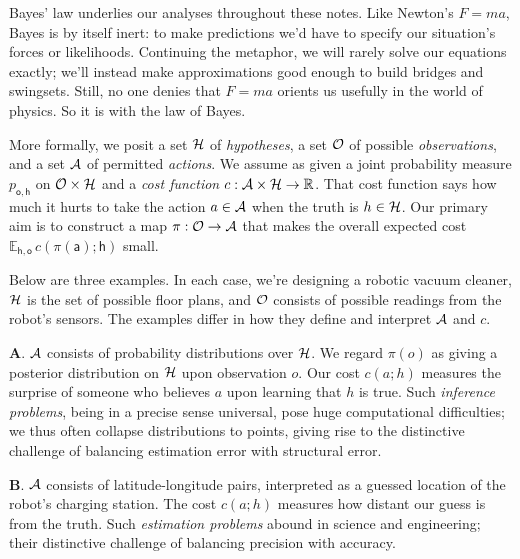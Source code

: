 \documentclass[11pt]{article}
\newcommand{\gre}{\color{mgre}}
\newcommand{\samsubsubsection}[1]{
   \vspace{0.1cm}
   \par\noindent{\hspace{-2cm}\normalsize \sc \gre #1} ---
}
\newcommand{\Ee}{\mathbb{E}}\newcommand{\eE}{\mathcal{E}}
\newcommand{\Rr}{\mathbb{R}}\newcommand{\rR}{\mathcal{R}}
\newcommand{\sfa}{\mathsf{a}}\newcommand{\fra}{\mathcal{a}}
\newcommand{\sfh}{\mathsf{h}}\newcommand{\frh}{\mathcal{h}}
\newcommand{\sfo}{\mathsf{o}}\newcommand{\fro}{\mathcal{o}}
\theoremstyle{definition}
\begin{document}
      Bayes' law underlies our analyses throughout these notes.
      Like Newton's $F=ma$, Bayes is by itself inert: to make predictions we'd
      have to specify our situation's forces or likelihoods.  Continuing the
      metaphor, we will rarely solve our equations exactly; we'll instead make
      approximations good enough to build bridges and swingsets.  Still, no one
      denies that $F=ma$ orients us usefully in the world of physics.  So it is
      with the law of Bayes.

      More formally, we posit a set $\mathcal{H}$ of \emph{hypotheses}, a set $\mathcal{O}$ of
      possible \emph{observations}, and a set $\mathcal{A}$ of permitted
      \emph{actions}.  We assume as given a joint probability measure
      $p_{\sfo,\sfh}$ on $\mathcal{O}\times \mathcal{H}$ and a \emph{cost function}
      $c:\aA\times \hH \to \Rr$.
      That cost function says how much it hurts to take the action $a\in \mathcal{A}$
      when the truth is $h\in \mathcal{H}$.
      Our primary aim is to construct a map $\pi:\mathcal{O}\to \mathcal{A}$ that makes the
      overall expected cost $\Ee_{\sfh,\sfo} \, c(\pi(\sfa); \sfh)$ small.

      Below are three examples.  In each case, we're designing a robotic vacuum
      cleaner, $\mathcal{H}$ is the set of possible floor plans, and $\mathcal{O}$ consists of
      possible readings from the robot's sensors.  The examples differ in how
      they define and interpret $\mathcal{A}$ and $c$.

      \textbf{A}.  $\mathcal{A}$ consists of probability distributions over $\mathcal{H}$. We
      regard $\pi(o)$ as giving a posterior distribution on $\mathcal{H}$ upon
      observation $o$.  Our cost $c(a;h)$ measures the surprise of someone who
      believes $a$ upon learning that $h$ is true. 
      Such \emph{inference problems}, being in a precise sense universal, pose
      huge computational difficulties; we thus often collapse distributions to
      points, giving rise to the distinctive challenge of balancing estimation
      error with structural error.

      \textbf{B}.
      $\mathcal{A}$ consists of latitude-longitude pairs, interpreted as a guessed
      location of the robot's charging station.  The cost $c(a;h)$ measures how
      distant our guess is from the truth.  
      Such \emph{estimation problems} abound in science and engineering; their
      distinctive challenge of balancing precision with accuracy.
\end{document}
